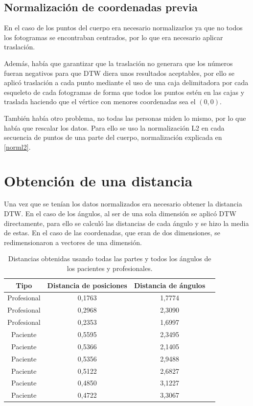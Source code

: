 \subsection{Normalización de coordenadas previa}
En el caso de los puntos del cuerpo era necesario normalizarlos ya que no todos los fotogramas se encontraban centrados, por lo que era necesario aplicar traslación. 

Además, había que garantizar que la traslación no generara que los números fueran negativos para que DTW diera unos resultados aceptables, por ello se aplicó traslación a cada punto  mediante el uso de una caja delimitadora por cada esqueleto de cada fotogramas de forma que todos los puntos estén en las cajas y traslada haciendo que el vértice con menores coordenadas sea el $(0,0)$.

También había otro problema, no todas las personas miden lo mismo, por lo que había que rescalar los datos. Para ello se uso la normalización L2 en cada secuencia de puntos de una parte del cuerpo, normalización explicada en \ref{norml2}. 

\section{Obtención de una distancia}
Una vez que se tenían los datos normalizados era necesario obtener la distancia DTW.  En el caso de los ángulos, al ser de una sola dimensión se aplicó DTW directamente, para ello se calculó las distancias de cada ángulo y se hizo la media de estas. En el caso de las coordenadas, que eran de dos dimensiones, se redimensionaron a vectores de una dimensión.

\begin{table}
	\centering
	\begin{tabular}{|c|c|c|c|}
		\hline
		\textbf{Tipo}  & \textbf{Distancia de posiciones} & \textbf{Distancia de ángulos}\\
		\hline
		Profesional & 0,1763 & 1,7774 \\
		\hline
	    Profesional & 0,2968 & 2,3090 \\
		\hline
		Profesional & 0,2353 & 1,6997 \\
		\hline
		Paciente & 0,5595 &  2,3495 \\
		\hline
		Paciente & 0,5366 & 2,1405 \\
		\hline
		Paciente  & 0,5356 & 2,9488 \\
		\hline
		Paciente & 0,5122 &  2,6827 \\
		\hline
	    Paciente & 0,4850 & 3,1227 \\
		\hline
		Paciente & 0,4722 & 3,3067 \\
		\hline
	\end{tabular}
	\caption{Distancias obtenidas usando todas las partes y todos los ángulos de los pacientes y profesionales.}
	\label{tab:alldistances}
\end{table}

